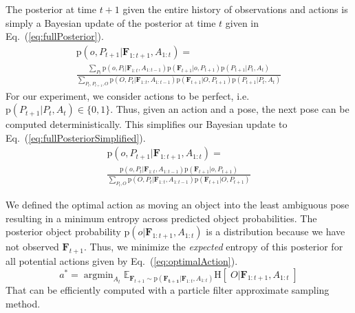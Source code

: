 \documentclass[conference]{IEEEtran}
\renewcommand{\eqref}[1]{Eq.~(\ref{#1})}
\newcommand{\prob}[1]{\text{p}(#1)} %
\newcommand{\set}[1]{\mathbf{#1}} %
\newcommand{\italic}[1]{\textit{#1}} %
\DeclareMathOperator*{\argmin}{argmin}
\newcommand{\entropy}[1]{\text{H}\left[\;#1 \; \right]} %
\newcommand{\expectedValue}[2]{\hollow{E}_{#2}#1} %
\newcommand{\hollow}[1]{\mathbb{#1}} %
\begin{document}


        
        The posterior at time $t+1$ given the entire history of observations and actions is simply a Bayesian update of the posterior at time $t$ given in \eqref{eq:fullPosterior}.
        \begin{multline}
            \label{eq:fullPosterior}
            \prob{o,P_{t+1}|\set{F}_{1:t+1},A_{1:t}} = \\ \frac{ \sum_{P_t} \prob{o,P_t|\set{F}_{1:t},A_{1:t-1}} \prob{\set{F}_{t+1}|o,P_{t+1}} \prob{P_{t+1}|P_t,A_t}}{\sum_{P_t,P_{t+1},O} \prob{O,P_t|\set{F}_{1:t},A_{1:t-1}} \prob{\set{F}_{t+1}|O,P_{t+1}} \prob{P_{t+1}|P_t,A_t}}
        \end{multline}
        For our experiment, we consider actions to be perfect, i.e. $\prob{P_{t+1}|P_t,A_t} \in \{ 0 , 1 \}$. Thus, given an action and a pose, the next pose can be computed deterministically. This simplifies our Bayesian update to \eqref{eq:fullPosteriorSimplified}.
        \begin{multline}
            \label{eq:fullPosteriorSimplified}
            \prob{o,P_{t+1}|\set{F}_{1:t+1},A_{1:t}} = \\ \frac{\prob{o,P_t|\set{F}_{1:t},A_{1:t-1}} \prob{\set{F}_{t+1}|o,P_{t+1}} }{\sum_{P_t,O} \prob{O,P_t|\set{F}_{1:t},A_{1:t-1}} \prob{\set{F}_{t+1}|O,P_{t+1}} }
        \end{multline}
        
        We defined the optimal action as moving an object into the least ambiguous pose resulting in a minimum entropy across predicted object probabilities. The posterior object probability $\prob{o|\set{F}_{1:t+1},A_{1:t}}$ is a distribution because we have not observed $\set{F}_{t+1}$. Thus, we minimize the \italic{expected} entropy of this posterior for all potential actions given by \eqref{eq:optimalAction}.
        \begin{equation}
            \label{eq:optimalAction}
            a^* = \argmin_{A_t} \expectedValue{ \entropy{O|\set{F}_{1:t+1},A_{1:t}} }{\set{F}_{t+1} \sim \prob{\set{F_{t+1}}|\set{F}_{1:t},A_{1:t}}}
        \end{equation}
        That can be efficiently computed with a particle filter approximate sampling method.
\end{document}

